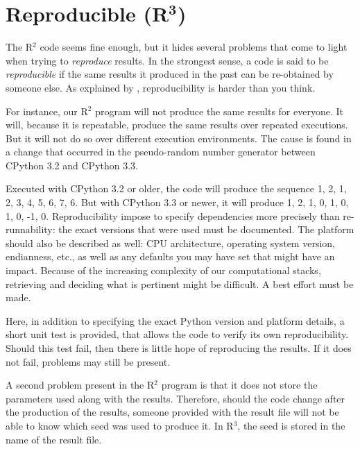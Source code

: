 \documentclass[a4paper,11pt]{article}
\begin{document}
\clearpage
\section*{Reproducible (R$^{\mathbf 3}$)}

The R$^2$ code seems fine enough, 
but it hides several problems that come to light when trying to {\em reproduce} results.
In the strongest sense, a code is said to be {\em reproducible}
if the same results it produced in the past can be re-obtained by someone else.
As explained by \citeauthor{Mesnard:2016} \citep{Mesnard:2016}, reproducibility is harder than you think. 

For instance, our R$^2$ program will not produce the same results for everyone. It will, because it is repeatable, produce the same results over repeated executions. But it will not do so over different execution environments. The cause is found in a change that occurred in the pseudo-random number generator between CPython 3.2 and CPython 3.3. 

Executed with CPython 3.2 or older, the code will produce the sequence 1, 2, 1, 2, 3, 4, 5, 6, 7, 6. But with CPython 3.3 or newer, it will produce 1, 2, 1, 0, 1, 0, 1, 0, -1, 0. Reproducibility impose to specify dependencies more precisely than re-runnability: the exact versions that were used must be documented. The platform should also be described as well: CPU architecture, operating system version, endianness, etc., as well as any defaults you may have set that might have an impact. Because of the increasing complexity of our computational stacks, retrieving and deciding what is pertinent might be difficult. A best effort must be made. 

Here, in addition to specifying the exact Python version and platform details, a short unit test is provided, that allows the code to verify its own reproducibility. Should this test fail, then there is little hope of reproducing the results. If it does not fail, problems may still be present. 

A second problem present in the R$^2$ program is that it does not store the parameters used along with the results. Therefore, should the code change after the production of the results, someone provided with the result file will not be able to know which seed was used to produce it. In R$^3$, the seed is stored in the name of the result file.

\end{document}
